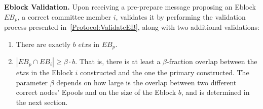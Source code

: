 \textbf{Eblock Validation.} Upon receiving a pre-prepare message proposing an Eblock $EB_p$, a correct committee member $i$, validates it by performing the validation process presented in~\ref{Protocol:ValidateEB}, along with two additional validations: 
\begin{enumerate}
\item There are exactly $b$ $etx$s in $EB_p$.
\item $ |EB_p\cap EB_i|\geq \beta \cdot b$. That is, there is at least a $\beta$-fraction overlap between the $etx$s in the Eblock $i$ constructed and the one the primary constructed. The parameter $\beta$ depends on how large is the overlap between two different correct nodes' Epools and on the size of the Eblock $b$, and is determined in the next section.
\end{enumerate}





